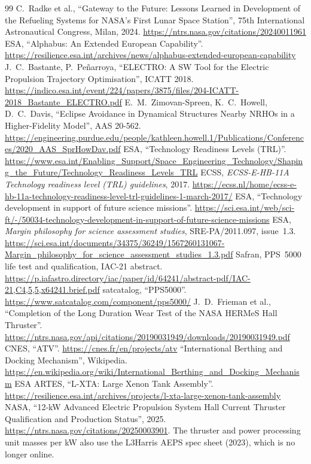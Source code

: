 \documentclass[11pt,a4paper]{article}
\begin{document}
\begin{thebibliography}{99}
 C.~Radke et al., ``Gateway to the Future: Lessons Learned in Development of the Refueling Systems for NASA's First Lunar Space Station'', 75th International Astronautical Congress, Milan, 2024. \url{https://ntrs.nasa.gov/citations/20240011961}
 ESA, ``Alphabus: An Extended European Capability''. \url{https://resilience.esa.int/archives/news/alphabus-extended-european-capability}
 J.~C.~Bastante, P.~Peñarroya, ``ELECTRO: A SW Tool for the Electric Propulsion Trajectory Optimisation'', ICATT 2018. \url{https://indico.esa.int/event/224/papers/3875/files/204-ICATT-2018_Bastante_ELECTRO.pdf}
 E.~M.~Zimovan-Spreen, K.~C.~Howell, D.~C.~Davis, ``Eclipse Avoidance in Dynamical Structures Nearby NRHOs in a Higher-Fidelity Model'', AAS 20-562. \url{https://engineering.purdue.edu/people/kathleen.howell.1/Publications/Conferences/2020_AAS_SprHowDav.pdf}
 ESA, ``Technology Readiness Levels (TRL)''. \url{https://www.esa.int/Enabling_Support/Space_Engineering_Technology/Shaping_the_Future/Technology_Readiness_Levels_TRL}
 ECSS, \emph{ECSS-E-HB-11A Technology readiness level (TRL) guidelines}, 2017. \url{https://ecss.nl/home/ecss-e-hb-11a-technology-readiness-level-trl-guidelines-1-march-2017/}
 ESA, ``Technology development in support of future science missions''. \url{https://sci.esa.int/web/sci-ft/-/50034-technology-development-in-support-of-future-science-missions}
 ESA, \emph{Margin philosophy for science assessment studies}, SRE-PA/2011.097, issue~1.3. \url{https://sci.esa.int/documents/34375/36249/1567260131067-Margin_philosophy_for_science_assessment_studies_1.3.pdf}
 Safran, PPS~5000 life test and qualification, IAC-21 abstract. \url{https://p.iafastro.directory/iac/paper/id/64241/abstract-pdf/IAC-21,C4,5,5,x64241.brief.pdf}
 satcatalog, ``PPS5000''. \url{https://www.satcatalog.com/component/pps5000/}
 J.~D.~Frieman et al., ``Completion of the Long Duration Wear Test of the NASA HERMeS Hall Thruster''. \url{https://ntrs.nasa.gov/api/citations/20190031949/downloads/20190031949.pdf}
 CNES, ``ATV''. \url{https://cnes.fr/en/projects/atv}
 ``International Berthing and Docking Mechanism'', Wikipedia. \url{https://en.wikipedia.org/wiki/International_Berthing_and_Docking_Mechanism}
 ESA ARTES, ``L-XTA: Large Xenon Tank Assembly''. \url{https://resilience.esa.int/archives/projects/l-xta-large-xenon-tank-assembly}
 NASA, ``12-kW Advanced Electric Propulsion System Hall Current Thruster Qualification and Production Status'', 2025. \url{https://ntrs.nasa.gov/citations/20250003901}. The thruster and power processing unit masses per kW also use the L3Harris AEPS spec sheet (2023), which is no longer online.

\end{thebibliography}
\end{document}
